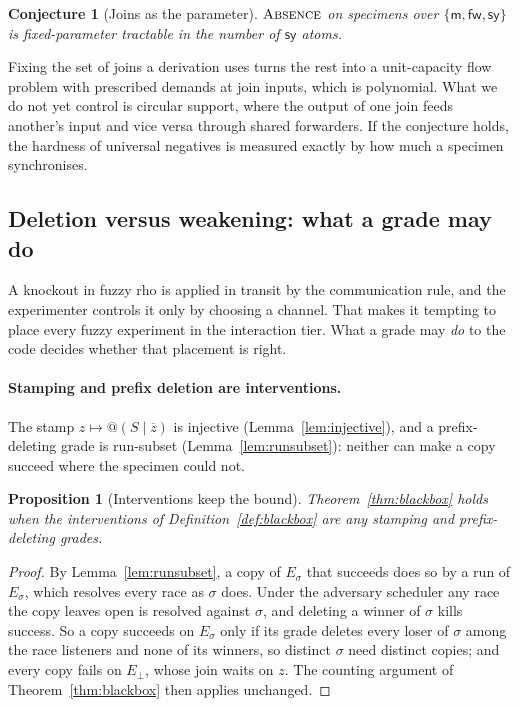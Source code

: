 \documentclass[11pt]{article}
\makeatletter
\theoremstyle{definition}
\theoremstyle{plain}
\newtheorem{proposition}[definition]{Proposition}
\newtheorem{conjecture}[definition]{Conjecture}
\theoremstyle{remark}
\newcommand{\quo}[1]{@#1}
\newcommand{\dr}[1]{\overline{#1}}
\newcommand{\ABS}{\textup{\textsc{Absence}}}
\newcommand{\cm}{\mathsf{m}}
\newcommand{\cfw}{\mathsf{fw}}
\newcommand{\csy}{\mathsf{sy}}
\makeatother
\begin{document}
\begin{conjecture}[Joins as the parameter]\label{conj:fpt}
$\ABS$ on specimens over $\{\cm, \cfw, \csy\}$ is fixed-parameter tractable
in the number of $\csy$ atoms.
\end{conjecture}

\noindent
Fixing the set of joins a derivation uses turns the rest into a
unit-capacity flow problem with prescribed demands at join inputs, which
is polynomial. What we do not yet control is circular support, where the
output of one join feeds another's input and vice versa through shared
forwarders. If the conjecture holds, the hardness of universal negatives
is measured exactly by how much a specimen synchronises.

\subsection{Deletion versus weakening: what a grade may do}\label{sec:covert}

A knockout in fuzzy rho is applied in transit by the communication rule,
and the experimenter controls it only by choosing a channel. That makes it
tempting to place every fuzzy experiment in the interaction tier. What a
grade may \emph{do} to the code decides whether that placement is right.

\paragraph{Stamping and prefix deletion are interventions.} The stamp
$z \mapsto \quo{(S \mid \dr z)}$ is injective
(Lemma~\ref{lem:injective}), and a prefix-deleting grade is run-subset
(Lemma~\ref{lem:runsubset}): neither can make a copy succeed where the
specimen could not.

\begin{proposition}[Interventions keep the bound]\label{prop:keep}
Theorem~\ref{thm:blackbox} holds when the interventions of
Definition~\ref{def:blackbox} are any stamping and prefix-deleting grades.
\end{proposition}

\begin{proof}
By Lemma~\ref{lem:runsubset}, a copy of $E_\sigma$ that succeeds does so
by a run of $E_\sigma$, which resolves every race as $\sigma$ does. Under
the adversary scheduler any race the copy leaves open is resolved against
$\sigma$, and deleting a winner of $\sigma$ kills success. So a copy
succeeds on $E_\sigma$ only if its grade deletes every loser of $\sigma$
among the race listeners and none of its winners, so distinct $\sigma$
need distinct copies; and every copy fails on $E_\bot$, whose join waits
on $z$.
The counting argument of Theorem~\ref{thm:blackbox} then applies
unchanged.
\end{proof}
\end{document}

